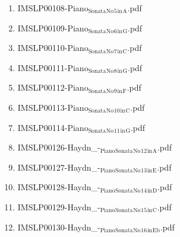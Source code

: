 \documentclass[11pt]{article}
\begin{document}
\begin{enumerate}
\begin{enumerate}
\item IMSLP00108-Piano$_{\text{Sonata}}$$_{\text{No}}$$_{\text{5}}$$_{\text{in}}$$_{\text{A}}$.pdf
\label{sec-1-1-1-1-44-38-4-4}

\item IMSLP00109-Piano$_{\text{Sonata}}$$_{\text{No}}$$_{\text{6}}$$_{\text{in}}$$_{\text{G}}$.pdf
\label{sec-1-1-1-1-44-38-4-5}

\item IMSLP00110-Piano$_{\text{Sonata}}$$_{\text{No}}$$_{\text{7}}$$_{\text{in}}$$_{\text{C}}$.pdf
\label{sec-1-1-1-1-44-38-4-6}

\item IMSLP00111-Piano$_{\text{Sonata}}$$_{\text{No}}$$_{\text{8}}$$_{\text{in}}$$_{\text{G}}$.pdf
\label{sec-1-1-1-1-44-38-4-7}

\item IMSLP00112-Piano$_{\text{Sonata}}$$_{\text{No}}$$_{\text{9}}$$_{\text{in}}$$_{\text{F}}$.pdf
\label{sec-1-1-1-1-44-38-4-8}

\item IMSLP00113-Piano$_{\text{Sonata}}$$_{\text{No}}$$_{\text{10}}$$_{\text{in}}$$_{\text{C}}$.pdf
\label{sec-1-1-1-1-44-38-4-9}

\item IMSLP00114-Piano$_{\text{Sonata}}$$_{\text{No}}$$_{\text{11}}$$_{\text{in}}$$_{\text{G}}$.pdf
\label{sec-1-1-1-1-44-38-4-10}

\item IMSLP00126-Haydn\_-$_{\text{Piano}}$$_{\text{Sonata}}$$_{\text{No}}$$_{\text{12}}$$_{\text{in}}$$_{\text{A}}$.pdf
\label{sec-1-1-1-1-44-38-4-11}

\item IMSLP00127-Haydn\_-$_{\text{Piano}}$$_{\text{Sonata}}$$_{\text{No}}$$_{\text{13}}$$_{\text{in}}$$_{\text{E}}$.pdf
\label{sec-1-1-1-1-44-38-4-12}

\item IMSLP00128-Haydn\_-$_{\text{Piano}}$$_{\text{Sonata}}$$_{\text{No}}$$_{\text{14}}$$_{\text{in}}$$_{\text{D}}$.pdf
\label{sec-1-1-1-1-44-38-4-13}

\item IMSLP00129-Haydn\_-$_{\text{Piano}}$$_{\text{Sonata}}$$_{\text{No}}$$_{\text{15}}$$_{\text{in}}$$_{\text{C}}$.pdf
\label{sec-1-1-1-1-44-38-4-14}

\item IMSLP00130-Haydn\_-$_{\text{Piano}}$$_{\text{Sonata}}$$_{\text{No}}$$_{\text{16}}$$_{\text{in}}$$_{\text{Eb}}$.pdf
\label{sec-1-1-1-1-44-38-4-15}


\end{enumerate}
\end{enumerate}
\end{document}
